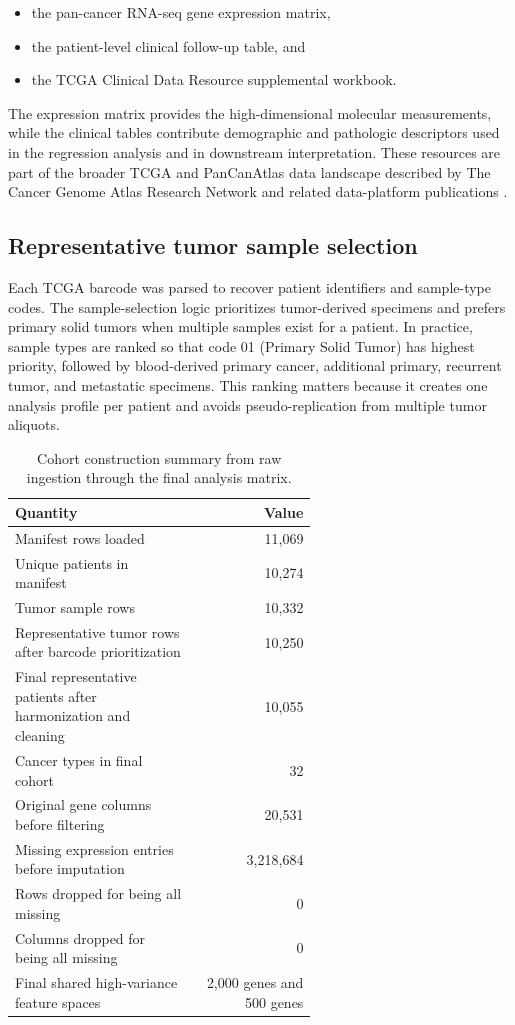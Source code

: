 \documentclass[11pt]{article}
\begin{document}
\begin{itemize}
  \item the pan-cancer RNA-seq gene expression matrix,
  \item the patient-level clinical follow-up table, and
  \item the TCGA Clinical Data Resource supplemental workbook.
\end{itemize}

The expression matrix provides the high-dimensional molecular measurements, while the clinical tables contribute demographic and pathologic descriptors used in the regression analysis and in downstream interpretation. These resources are part of the broader TCGA and PanCanAtlas data landscape described by The Cancer Genome Atlas Research Network and related data-platform publications \cite{weinstein2013tcga,grossman2016shared,goldman2020xena,liu2018cdr}.

\subsection{Representative tumor sample selection}
Each TCGA barcode was parsed to recover patient identifiers and sample-type codes. The sample-selection logic prioritizes tumor-derived specimens and prefers primary solid tumors when multiple samples exist for a patient. In practice, sample types are ranked so that code 01 (Primary Solid Tumor) has highest priority, followed by blood-derived primary cancer, additional primary, recurrent tumor, and metastatic specimens. This ranking matters because it creates one analysis profile per patient and avoids pseudo-replication from multiple tumor aliquots.

\begin{table}[H]
\centering
\caption{Cohort construction summary from raw ingestion through the final analysis matrix.}
\begin{tabular}{p{0.60\linewidth}r}
\toprule
\textbf{Quantity} & \textbf{Value} \\
\midrule
Manifest rows loaded & 11,069 \\
Unique patients in manifest & 10,274 \\
Tumor sample rows & 10,332 \\
Representative tumor rows after barcode prioritization & 10,250 \\
Final representative patients after harmonization and cleaning & 10,055 \\
Cancer types in final cohort & 32 \\
Original gene columns before filtering & 20,531 \\
Missing expression entries before imputation & 3,218,684 \\
Rows dropped for being all missing & 0 \\
Columns dropped for being all missing & 0 \\
Final shared high-variance feature spaces & 2,000 genes and 500 genes \\
\bottomrule
\end{tabular}
\label{tab:cohort-summary}
\end{table}
\end{document}
